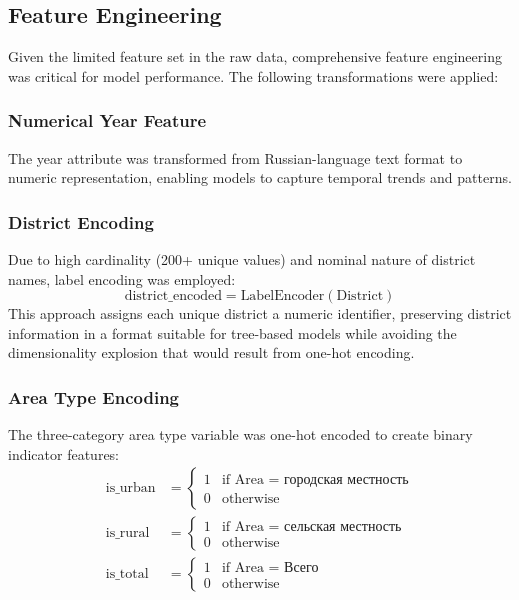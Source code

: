 \subsection{Feature Engineering}

Given the limited feature set in the raw data, comprehensive feature engineering was critical for model performance. The following transformations were applied:

\subsubsection{Numerical Year Feature}
The year attribute was transformed from Russian-language text format to numeric representation, enabling models to capture temporal trends and patterns.

\subsubsection{District Encoding}
Due to high cardinality (200+ unique values) and nominal nature of district names, label encoding was employed:
\begin{equation}
    \text{district\_encoded} = \text{LabelEncoder}(\text{District})
\end{equation}
This approach assigns each unique district a numeric identifier, preserving district information in a format suitable for tree-based models while avoiding the dimensionality explosion that would result from one-hot encoding.

\subsubsection{Area Type Encoding}
The three-category area type variable was one-hot encoded to create binary indicator features:
\begin{align}
    \text{is\_urban} &= \begin{cases} 1 & \text{if Area = городская местность} \\ 0 & \text{otherwise} \end{cases} \\
    \text{is\_rural} &= \begin{cases} 1 & \text{if Area = сельская местность} \\ 0 & \text{otherwise} \end{cases} \\
    \text{is\_total} &= \begin{cases} 1 & \text{if Area = Всего} \\ 0 & \text{otherwise} \end{cases}
\end{align}

